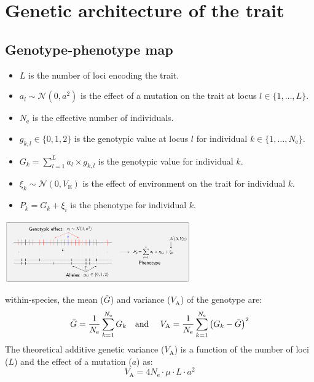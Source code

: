 \documentclass{article}
\newcommand{\Multiply}{\cdot}
\newcommand{\Ne}{N_{\text{e}}}
\newcommand{\Indiv}{k}
\newcommand{\Trait}{P}
\newcommand{\MutationRatePheno}{\mu}
\newcommand{\NbrLoci}{L}
\newcommand{\VarGenetic}{V_{\mathrm{A}}}
\newcommand{\VarEnv}{V_{\mathrm{E}}}
\renewcommand{\baselinestretch}{1.5}
\begin{document}
\renewcommand{\baselinestretch}{1.0}\normalsize
\tableofcontents
\renewcommand{\baselinestretch}{1.5}\normalsize

\newpage
\section{Genetic architecture of the trait}\label{sec:simulator}

\subsection{Genotype-phenotype map}\label{subsec:genotype-phenotype-map}

\begin{itemize}
    \item $\NbrLoci$ is the number of loci encoding the trait.
    \item $a_l \sim \mathcal{N}(0,a^2)$ is the effect of a mutation on the trait at locus $l \in \{1, \hdots, \NbrLoci\}$.
    \item $\Ne$ is the effective number of individuals.
    \item $g_{\Indiv,l} \in \{0, 1, 2\}$ is the genotypic value at locus $l$ for individual $\Indiv \in \{1, \hdots, \Ne\}$.
    \item $G_{\Indiv} = \sum_{l=1}^{\NbrLoci} a_l \times g_{\Indiv,l}$ is the genotypic value for individual $\Indiv$.
    \item $\xi_{\Indiv} \sim \mathcal{N}(0, \VarEnv)$ is the effect of environment on the trait for individual $\Indiv$.
    \item $\Trait_{\Indiv} = G_{\Indiv}+ \xi_i$ is the phenotype for individual $\Indiv$.
\end{itemize}

\begin{center}
    \includegraphics[width=0.6\textwidth, page=1] {figureS1}
    \label{fig:simulator-summary}
\end{center}

within-species, the mean ($\bar{G}$) and variance ($\VarGenetic$) of the genotype are:
\begin{equation}
    \bar{G} = \frac{1}{\Ne}\sum_{\Indiv=1}^{\Ne} G_{\Indiv} \text{\quad and \quad} \VarGenetic = \frac{1}{\Ne}\sum_{\Indiv=1}^{\Ne}\left(G_{\Indiv}- \bar{G} \right)^2\label{eq:simu-genotype}
\end{equation}
The theoretical additive genetic variance ($\VarGenetic$) is a function of the number of loci ($\NbrLoci$) and the effect of a mutation ($a$) as:
\begin{equation}
    \VarGenetic = 4 \Ne \Multiply \MutationRatePheno \Multiply \NbrLoci \Multiply a^2 \label{eq:simu-var-genetic}
\end{equation}
\end{document}
